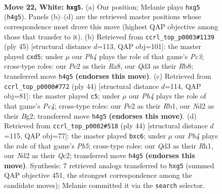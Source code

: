 \documentclass[11pt]{article}
\begin{document}
\clearpage

\begin{figure}[p]\centering
\begin{subfigure}{0.46\textwidth}\centering
\resizebox{\linewidth}{!}{%
\newchessgame
\chessboard[
  setfen={r1b1r1k1/p2nb2p/2p2p2/3q2p1/Pp1p1P1P/1P1Q2P1/3NPK2/RNB2R2 w - - 0 22},
  showmover=false,
  pgfstyle=straightmove, color=movearrow, markmove={h4-g5}
]}
\caption{}
\end{subfigure}\hfill
\begin{subfigure}{0.46\textwidth}\centering
\resizebox{\linewidth}{!}{%
\newchessgame
\chessboard[
  setfen={rr4k1/2qn1pbp/2p2np1/3Pp3/1PP2P2/3QBBP1/4N2P/1R3R1K b - - 0 23},
  showmover=false,
  pgfstyle=straightmove, color=movearrow, markmove={c6-d5}
]}
\caption{}
\end{subfigure}
\\[4pt]
\begin{subfigure}{0.46\textwidth}\centering
\resizebox{\linewidth}{!}{%
\newchessgame
\chessboard[
  setfen={r1b2qk1/1ppr1p2/2n1p1p1/3p2Pp/p1PP1Q1P/P3PN2/5PB1/1RR3K1 w - - 2 23},
  showmover=false,
  pgfstyle=straightmove, color=movearrow, markmove={c4-c5}
]}
\caption{}
\end{subfigure}\hfill
\begin{subfigure}{0.46\textwidth}\centering
\resizebox{\linewidth}{!}{%
\newchessgame
\chessboard[
  setfen={r1b2k1r/pp1nbp2/2p2q2/1PNp4/P2P3p/3BP3/2Q1NPP1/1R2K2R w K - 1 23},
  showmover=false,
  pgfstyle=straightmove, color=movearrow, markmove={b5-c6}
]}
\caption{}
\end{subfigure}
\caption{\textbf{Move 22, White: \texttt{hxg5}.} (a) Our position; Melanie plays \texttt{hxg5} (\texttt{h4g5}). Panels (b)--(d) are the retrieved master positions whose correspondence most drove this move (highest QAP objective among those that transfer to it). (b) Retrieved from \texttt{ccrl\_top\_p0003\#1139} (ply 45) [structural distance $d$=113, QAP obj=101]: the master played \texttt{cxd5}; under $\mu$ our \emph{Ph4} plays the role of that game's \emph{Pc3}; cross-type roles: our \emph{P}e2 as their \emph{R}a8, our \emph{Q}d3 as their \emph{R}b8; transferred move \texttt{h4g5} \textbf{(endorses this move)}. (c) Retrieved from \texttt{ccrl\_top\_p0000\#772} (ply 44) [structural distance $d$=114, QAP obj=81]: the master played \texttt{c5}; under $\mu$ our \emph{Ph4} plays the role of that game's \emph{Pc4}; cross-type roles: our \emph{P}e2 as their \emph{R}b1, our \emph{N}d2 as their \emph{B}g2; transferred move \texttt{h4g5} \textbf{(endorses this move)}. (d) Retrieved from \texttt{ccrl\_top\_p0002\#518} (ply 44) [structural distance $d$=115, QAP obj=77]: the master played \texttt{bxc6}; under $\mu$ our \emph{Ph4} plays the role of that game's \emph{Pb5}; cross-type roles: our \emph{Q}d3 as their \emph{R}h1, our \emph{N}d2 as their \emph{Q}c2; transferred move \texttt{h4g5} \textbf{(endorses this move)}. Synthesis: 7 retrieved analogs transferred to \texttt{hxg5} (summed QAP objective 451, the strongest correspondence among the candidate moves); Melanie committed it via the \texttt{search} selector.}
\label{fig:thought-m42}
\end{figure}
\end{document}
